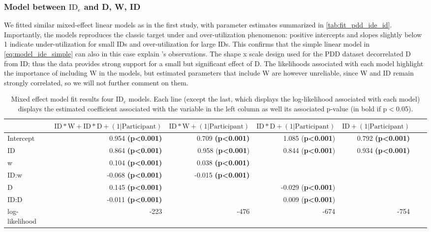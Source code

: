 \documentclass[acmlarge, manuscript,review]{acmart}
\newcommand{\ide}{\ensuremath{{\text{ID}_e}}\xspace}
\newcommand{\D}{\ensuremath{{\text{D}}}\xspace}
\newcommand{\W}{\ensuremath{{\text{W}}}\xspace}
\begin{document}
\subsubsection{Model between \ide and D, W, ID}
We fitted similar mixed-effect linear models as in the first study, with parameter estimates summarized in \autoref{tab:fit_pdd_ide_id}.
Importantly, the models reproduces the classic target under and over-utilization phenomenon: positive intercepts and slopes slightly below 1 indicate under-utilization for small IDs and over-utilization for large IDs. This confirms that the simple linear model in \autoref{eq:model_ide_simple} can also in this case explain \citeauthor{zhai2004nominal}'s observations. The shape x scale design used for the PDD dataset decorrelated D from ID; thus the data provides strong support for a small but significant effect of D. The likelihoods associated with each model highlight the importance of including W in the models, but estimated parameters that include W are however unreliable, since W and ID remain strongly correlated, so we will not further comment on them.

\begin{table}
	\caption{Mixed effect model fit results four \ide models. Each line (except the last, which displays the log-likelihood associated with each model) displays the estimated coefficient associated with the variable in the left column as well its associated p-value (in bold if p$<$0.05).}
	\label{tab:fit_pdd_ide_id}
\begin{center}
	\begin{tabular}{lrrrrrr}
	\hline
			  &  $\text{ID}*\W + \text{ID}*\D + (1|\text{Participant})$ & $\text{ID}*\W + (1|\text{Participant})$ &  $ \text{ID}*\D + (1|\text{Participant})$ & $\text{ID}+ (1|\text{Participant})$  \\
	\hline
	Intercept &  0.954 \textbf{(p\textless0.001)} &    				0.709 \textbf{(p\textless0.001)} & 1.085 (\textbf{p\textless0.001})  & 0.792 \textbf{(p\textless0.001)} \\
	ID        &  0.864 \textbf{(p\textless0.001)} &    0.958 (\textbf{p\textless0.001}) &  0.844 (\textbf{p\textless0.001}) & 0.934 \textbf{(p\textless0.001)}  \\
	w         & 0.104 \textbf{(p\textless0.001)} & 0.038 \textbf{(p\textless0.001)}    &   & \\
	ID:w      & -0.068 \textbf{(p\textless0.001)} &    -0.015 \textbf{(p\textless0.001)}  &   & \\
	D         &  0.145 \textbf{(p\textless0.001)} &    &  -0.029 (\textbf{p\textless0.001})  & \\
	ID:D      & -0.011 \textbf{(p\textless0.001)} &     & 0.009 (\textbf{p\textless0.001})   & \\
	log-likelihood & -223 & -476 & -674  & -754\\
	\hline
	\end{tabular}
	\end{center}
	\end{table}
\end{document}
